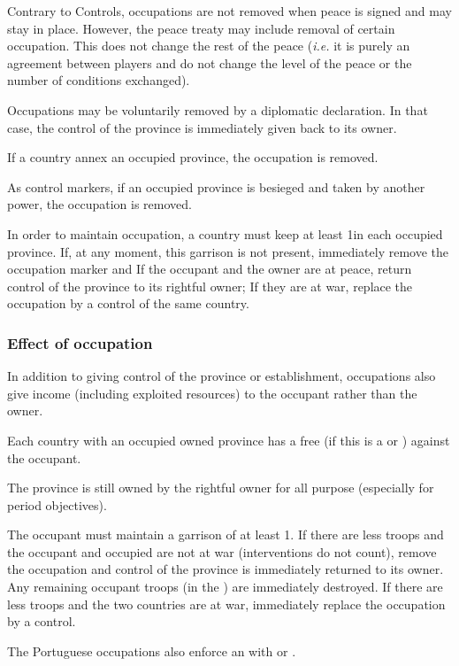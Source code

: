 \aparag Contrary to Controls, occupations are not removed when peace
is signed and may stay in place.
\bparag However, the peace treaty may include removal of certain
occupation. This does not change the rest of the peace (\emph{i.e.} it
is purely an agreement between players and do not change the level of
the peace or the number of conditions exchanged).

\aparag Occupations may be voluntarily removed by a diplomatic
declaration. In that case, the control of the province is immediately
given back to its owner.

\aparag If a country annex an occupied province, the occupation is
removed.

\aparag As control markers, if an occupied province is besieged and
taken by another power, the occupation is removed.

\aparag In order to maintain occupation, a country must keep at least
1\LD in each occupied province. If, at any moment, this garrison is
not present, immediately remove the occupation marker and
\bparag If the occupant and the owner are at peace, return
control of the province to its rightful owner;
\bparag If they are at war, replace the occupation by a control of the
same country.

\subsubsection{Effect of occupation}
\aparag In addition to giving control of the province or
establishment, occupations also give income (including exploited
resources) to the occupant rather than the owner.

\aparag Each country with an occupied owned province has a free \CB
(\OCB if this is a \COL or \TP) against the occupant.

\aparag The province is still owned by the rightful owner for all \VPs
purpose (especially for period objectives).

\aparag The occupant must maintain a garrison of at least 1\LD.
\bparag If there are less troops and the occupant and occupied are not
at war (interventions do not count), remove the occupation and control
of the province is immediately returned to its owner. Any remaining
occupant troops (\de in the \ROTW) are immediately destroyed.
\bparag If there are less troops and the two countries are at war,
immediately replace the occupation by a control.

\aparag The Portuguese occupations also enforce an \dipAT with
\paysOman or \paysAden.

